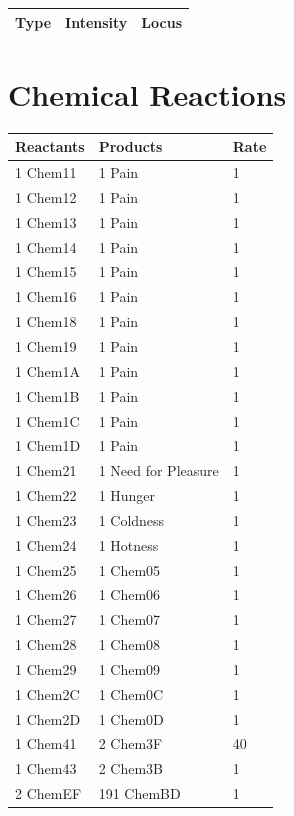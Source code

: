 \documentclass{article}
\begin{document}
\begin{longtable}{|p{2cm}|p{2cm}|p{4cm}|}
\hline
{\bf Type} & {\bf Intensity} & {\bf Locus} \\ \hline
\end{longtable}

\section*{Chemical Reactions}

\begin{longtable}{|p{4cm}|p{4cm}|p{2cm}|}
\hline
{\bf Reactants} & {\bf Products} & {\bf Rate} \\ \hline
1 Chem11 & 1 Pain & 1 \\ \hline
1 Chem12 & 1 Pain & 1 \\ \hline
1 Chem13 & 1 Pain & 1 \\ \hline
1 Chem14 & 1 Pain & 1 \\ \hline
1 Chem15 & 1 Pain & 1 \\ \hline
1 Chem16 & 1 Pain & 1 \\ \hline
1 Chem18 & 1 Pain & 1 \\ \hline
1 Chem19 & 1 Pain & 1 \\ \hline
1 Chem1A & 1 Pain & 1 \\ \hline
1 Chem1B & 1 Pain & 1 \\ \hline
1 Chem1C & 1 Pain & 1 \\ \hline
1 Chem1D & 1 Pain & 1 \\ \hline
1 Chem21 & 1 Need for Pleasure & 1 \\ \hline
1 Chem22 & 1 Hunger & 1 \\ \hline
1 Chem23 & 1 Coldness & 1 \\ \hline
1 Chem24 & 1 Hotness & 1 \\ \hline
1 Chem25 & 1 Chem05 & 1 \\ \hline
1 Chem26 & 1 Chem06 & 1 \\ \hline
1 Chem27 & 1 Chem07 & 1 \\ \hline
1 Chem28 & 1 Chem08 & 1 \\ \hline
1 Chem29 & 1 Chem09 & 1 \\ \hline
1 Chem2C & 1 Chem0C & 1 \\ \hline
1 Chem2D & 1 Chem0D & 1 \\ \hline
1 Chem41 & 2 Chem3F & 40 \\ \hline
1 Chem43 & 2 Chem3B & 1 \\ \hline
2 ChemEF & 191 ChemBD & 1 \\ \hline

\end{longtable}
\end{document}

